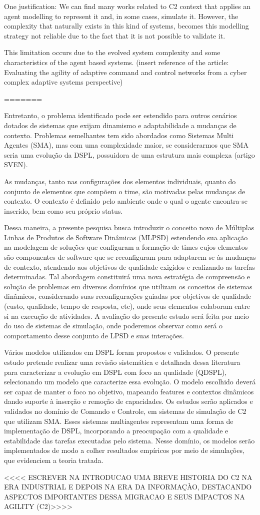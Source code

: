 One justification: 
We can find many works related to C2 context that applies an agent modelling to represent it and, in some cases, simulate it. However, the complexity that naturally exists in this kind of systems, becomes this modelling strategy not reliable due to the fact that it is not possible to validate it.

This limitation occurs due to the evolved system complexity and some characteristics of the agent based systems. (insert reference of the article: Evaluating the agility of adaptive command and control networks from a cyber complex adaptive systems perspective)


=======


Entretanto, o problema identificado pode ser estendido para outros cenários dotados de sistemas que exijam dinamismo e adaptabilidade a mudanças de contexto. Problemas semelhantes tem sido abordados como Sistemas Multi Agentes (SMA), mas com uma complexidade maior, se considerarmos que SMA seria uma evolução da DSPL, possuidora de uma estrutura mais complexa (artigo SVEN).



As mudanças, tanto nas configurações dos elementos individuais, quanto do conjunto de elementos que compõem o time, são motivadas pelas mudanças de contexto. O contexto é definido pelo ambiente onde o qual o agente encontra-se inserido, bem como seu próprio status. 



Dessa maneira, a presente pesquisa busca introduzir o conceito novo de Múltiplas Linhas de
Produtos de Software Dinâmicas (MLPSD) estendendo sua aplicação na modelagem de soluções
que configuram a formação de times cujos elementos são componentes de software que se
reconfiguram para adaptarem-se às mudanças de contexto, atendendo aos objetivos de qualidade
exigidos e realizando as tarefas determinadas.
Tal abordagem constituirá uma nova estratégia de compreensão e solução de problemas em
diversos domínios que utilizam os conceitos de sistemas dinâmicos, considerando suas
reconfigurações guiadas por objetivos de qualidade (custo, qualidade, tempo de resposta, etc),
onde seus elementos colaboram entre si na execução de atividades. A avaliação do presente
estudo será feita por meio do uso de sistemas de simulação, onde poderemos observar como será
o comportamento desse conjunto de LPSD e suas interações.


Vários modelos utilizados em DSPL foram propostos e validados. O presente estudo pretende realizar uma revisão sistemática e detalhada dessa literatura para caracterizar a evolução em DSPL com foco na qualidade (QDSPL), selecionando um modelo que caracterize essa evolução. O modelo escolhido deverá ser capaz de manter o foco no objetivo, mapeando features e contextos dinâmicos dando suporte à inserção e remoção de capacidades.
Os estudos serão aplicados e validados no domínio de Comando e Controle, em sistemas de simulação de C2 que utilizam SMA. Esses sistemas multiagentes representam uma forma de implementação de DSPL, incorporando a preocupação com a qualidade e estabilidade das tarefas executadas pelo sistema.
Nesse domínio, os modelos serão implementados de modo a colher resultados empíricos por meio de simulações, que evidenciem a teoria tratada.


<<<< ESCREVER NA INTRODUCAO UMA BREVE HISTORIA DO C2 NA ERA INDUSTRIAL E DEPOIS NA ERA DA INFORMAÇÀO, DESTACANDO ASPECTOS IMPORTANTES DESSA MIGRACAO E SEUS IMPACTOS NA AGILITY (C2)>>>>




